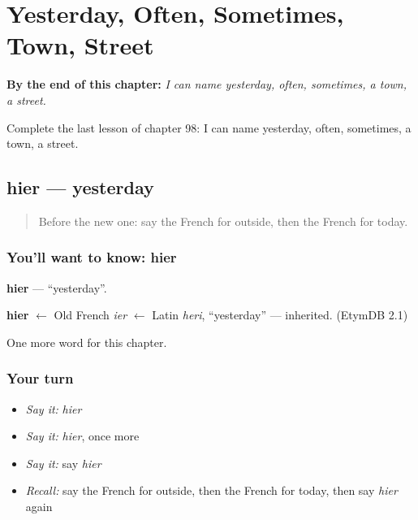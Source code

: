 
\chapter{Yesterday, Often, Sometimes, Town, Street}
\label{ch:fr-yesterday-often-sometimes-town-street}

\begin{chapteropening}
\textbf{By the end of this chapter:} \emph{I can name yesterday, often, sometimes, a town, a street.}

Complete the last lesson of chapter 98: I can name yesterday, often, sometimes, a town, a street.
\end{chapteropening}

\section[hier]{hier — yesterday}

\label{lesson:FR-C98-hier}



\begin{quote}
Before the new one: say the French for outside, then the French for today.
\end{quote}

\subsection*{You'll want to know: hier}
\textbf{hier} — \textquotedblleft{}yesterday\textquotedblright{}.

\begin{cousinweb}
\textbf{hier} $\leftarrow$ Old French \emph{ier} $\leftarrow$ Latin \emph{heri}, \textquotedblleft{}yesterday\textquotedblright{} — inherited. (EtymDB 2.1)
\end{cousinweb}

\begin{grammarlens}[title={What you've built}]
One more word for this chapter.
\end{grammarlens}

\subsection*{Your turn}
\begin{itemize}
\raggedright
  \item \emph{Say it:} \emph{hier}
  \item \emph{Say it:} \emph{hier}, once more
  \item \emph{Say it:} say \emph{hier}
  \item \emph{Recall:} say the French for outside, then the French for today, then say \emph{hier} again
\end{itemize}

